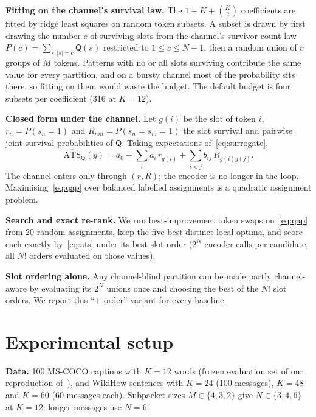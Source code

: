\documentclass[journal,onecolumn,11pt,draftclsnofoot]{IEEEtran}
\newcommand{\ATS}{\mathrm{ATS}}
\newcommand{\Q}{\mathsf{Q}}
\begin{document}
\textbf{Fitting on the channel's survival law.} The $1+K+\binom{K}{2}$ coefficients are fitted by ridge least squares on random token subsets. A subset is drawn by first drawing the number $c$ of surviving slots from the channel's survivor-count law $P(c)=\sum_{s:|s|=c}\Q(s)$ restricted to $1\le c\le N-1$, then a random union of $c$ groups of $M$ tokens. Patterns with no or all slots surviving contribute the same value for every partition, and on a bursty channel most of the probability sits there, so fitting on them would waste the budget. The default budget is four subsets per coefficient (316 at $K=12$).

\textbf{Closed form under the channel.} Let $g(i)$ be the slot of token $i$, $r_n=P(s_n=1)$ and $R_{nm}=P(s_n=s_m=1)$ the slot survival and pairwise joint-survival probabilities of $\Q$. Taking expectations of~\eqref{eq:surrogate},
\begin{equation}
\widehat{\ATS}_\Q(g)=a_0+\sum_i a_i\, r_{g(i)}+\sum_{i<j} b_{ij}\,R_{g(i)g(j)} .
\label{eq:qap}
\end{equation}
The channel enters only through $(r,R)$; the encoder is no longer in the loop. Maximising~\eqref{eq:qap} over balanced labelled assignments is a quadratic assignment problem.

\textbf{Search and exact re-rank.} We run best-improvement token swaps on~\eqref{eq:qap} from 20 random assignments, keep the five best distinct local optima, and score each exactly by~\eqref{eq:ats} under its best slot order ($2^N$ encoder calls per candidate, all $N!$ orders evaluated on those values).

\textbf{Slot ordering alone.} Any channel-blind partition can be made partly channel-aware by evaluating its $2^N$ unions once and choosing the best of the $N!$ slot orders. We report this ``+ order'' variant for every baseline.

\section{Experimental setup}

\textbf{Data.} 100 MS-COCO captions with $K=12$ words (frozen evaluation set of our reproduction of~\cite{lee2026look}), and WikiHow sentences with $K=24$ (100 messages), $K=48$ and $K=60$ (60 messages each). Subpacket sizes $M\in\{4,3,2\}$ give $N\in\{3,4,6\}$ at $K=12$; longer messages use $N=6$.
\end{document}
